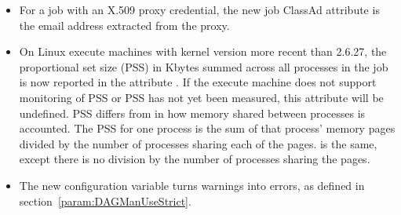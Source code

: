 \begin{itemize}

\item For a job with an X.509 proxy credential, the new job ClassAd
attribute  is the email address extracted
from the proxy.

\item On Linux execute machines with kernel version more recent than 2.6.27,
the proportional set size (PSS) in Kbytes summed across all
processes in the job is now reported in the attribute
.  If the execute machine does not
support monitoring of PSS or PSS has not yet been measured, this
attribute will be undefined.  PSS differs from  in
how memory shared between processes is accounted.  The PSS for one
process is the sum of that process' memory pages divided by the
number of processes sharing each of the pages.   is
the same, except there is no division by the number of processes
sharing the pages.

\item The new configuration variable  
turns warnings into errors, as defined in section~\ref{param:DAGManUseStrict}.


\end{itemize}

